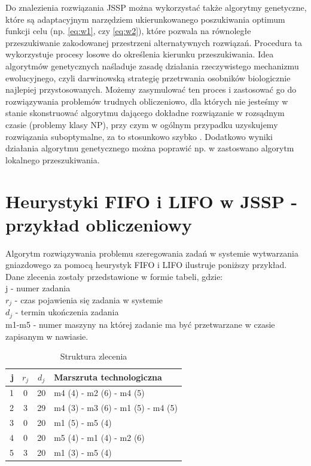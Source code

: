\documentclass[twoside]{kInzynierka}
\begin{document}
Do znalezienia rozwiązania JSSP można wykorzystać także algorytmy genetyczne, które są adaptacyjnym narzędziem ukierunkowanego poszukiwania optimum funkcji celu (np. \eqref{eq:w1}, czy \eqref{eq:w2}), które pozwala na równoległe przeszukiwanie zakodowanej przestrzeni alternatywnych rozwiązań. Procedura ta wykorzystuje procesy losowe do określenia kierunku przeszukiwania. Idea algorytmów genetycznych naśladuje zasadę działania rzeczywistego mechanizmu ewolucyjnego, czyli darwinowską strategię przetrwania osobników biologicznie najlepiej przystosowanych. Możemy zasymulować ten proces i zastosować go do rozwiązywania problemów trudnych obliczeniowo, dla których nie jesteśmy w stanie skonstruować algorytmu dającego dokładne rozwiązanie w rozsądnym czasie (problemy klasy NP), przy czym w ogólnym przypadku uzyskujemy rozwiązania suboptymalne, za to stosunkowo szybko \cite{grzechca}. Dodatkowo wyniki działania algorytmu genetycznego można poprawić np. w  \cite{genetyczne} zastoswano algorytm lokalnego przeszukiwania.

\section        [Heurystyki FIFO i LIFO \ldots]
                {Heurystyki FIFO i LIFO w JSSP \newlineTekst - przykład obliczeniowy}
Algorytm rozwiązywania problemu szeregowania zadań w systemie wytwarzania gniazdowego za pomocą heurystyk FIFO i LIFO ilustruje poniższy przykład. Dane zlecenia zostały przedstawione w formie tabeli, gdzie: \\
j - numer zadania \\
\(r_j\) - czas pojawienia się zadania w systemie \\
\(d_j\) - termin ukończenia zadania \\
m1-m5 - numer maszyny na której zadanie ma być przetwarzane w czasie zapisanym w nawiasie.
\begin{table}[htb]
	\centering
	\caption{Struktura zlecenia}
	\begin{tabular}{ | r | c | c | l | }
	\hline
	j	& \(r_j\)	& \(d_j\)	& Marszruta technologiczna	\\ \hline
	1	& 0	& 20	& m4 (4) - m2 (6) - m4 (5)	\\ \hline
	2	& 3	& 29	& m4 (3) - m3 (6) - m1 (5) - m4 (5)	\\ \hline
	3	& 0	& 20	& m1 (5) - m5 (4)	\\ \hline
	4	& 0	& 20	& m5 (4) - m1 (4) - m2 (6)	\\ \hline
	5	& 3	& 20	& m1 (3) - m5 (4)	\\ \hline
	\end{tabular}
\end{table}
\end{document}
